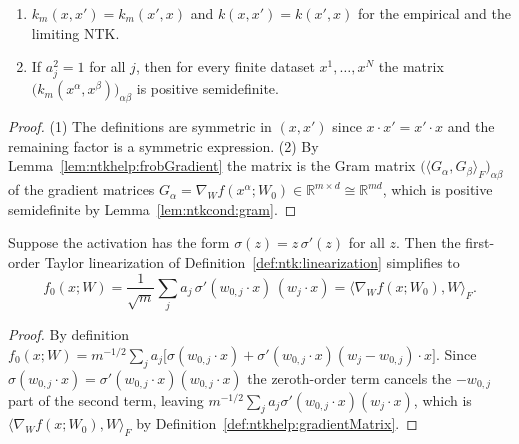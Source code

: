 \begin{lemma}\label{lem:ntkhelp:symmetryPsd}
  \leanok
\begin{enumerate}
  \item $k_m(x,x')=k_m(x',x)$ and $k(x,x')=k(x',x)$ for the empirical and the limiting NTK.
  \item If $a_j^2=1$ for all $j$, then for every finite dataset $x^1,\dots,x^N$ the matrix $\bigl(k_m(x^\alpha,x^\beta)\bigr)_{\alpha\beta}$ is positive semidefinite.
\end{enumerate}
\end{lemma}

\begin{proof}
  \leanok
(1) The definitions are symmetric in $(x,x')$ since $x\cdot x'=x'\cdot x$ and the remaining factor is a symmetric expression. (2) By Lemma~\ref{lem:ntkhelp:frobGradient} the matrix is the Gram matrix $\bigl(\langle G_\alpha,G_\beta\rangle_F\bigr)_{\alpha\beta}$ of the gradient matrices $G_\alpha=\nabla_Wf(x^\alpha;W_0)\in\mathbb R^{m\times d}\cong\mathbb R^{md}$, which is positive semidefinite by Lemma~\ref{lem:ntkcond:gram}.
\end{proof}

\begin{lemma}\label{lem:ntkhelp:reluLinearization}
  \leanok
Suppose the activation has the form $\sigma(z)=z\,\sigma'(z)$ for all $z$. Then the first-order Taylor linearization of Definition~\ref{def:ntk:linearization} simplifies to
\[
  f_0(x;W)=\frac1{\sqrt m}\sum_ja_j\,\sigma'(w_{0,j}\cdot x)\,(w_j\cdot x)=\bigl\langle\nabla_Wf(x;W_0),W\bigr\rangle_F .
\]
\end{lemma}

\begin{proof}
  \leanok
By definition $f_0(x;W)=m^{-1/2}\sum_ja_j\bigl[\sigma(w_{0,j}\cdot x)+\sigma'(w_{0,j}\cdot x)(w_j-w_{0,j})\cdot x\bigr]$. Since $\sigma(w_{0,j}\cdot x)=\sigma'(w_{0,j}\cdot x)(w_{0,j}\cdot x)$ the zeroth-order term cancels the $-w_{0,j}$ part of the second term, leaving $m^{-1/2}\sum_ja_j\sigma'(w_{0,j}\cdot x)(w_j\cdot x)$, which is $\langle\nabla_Wf(x;W_0),W\rangle_F$ by Definition~\ref{def:ntkhelp:gradientMatrix}.
\end{proof}

